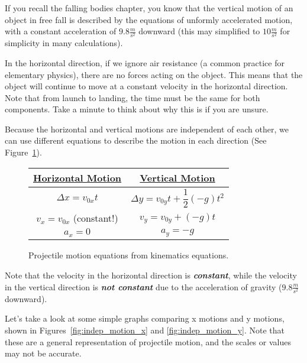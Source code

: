If you recall the falling bodies chapter, you know that the vertical motion of an object in free fall is described by the equations of unformly accelerated motion, with a constant acceleration of $9.8 \frac{m}{s^2}$ downward (this may simplified to $10 \frac{m}{s^2}$ for simplicity in many calculations).

In the horizontal direction, if we ignore air resistance (a common practice for elementary physics), there are no forces acting on the object. This means that the object will continue to move at a constant velocity in the horizontal direction. Note that from launch to landing, the time must be the same for both components. Take a minute to think about why this is if you are unsure.

Because the horizontal and vertical motions are independent of each other, we can use different equations to describe the motion in each direction (See Figure~\ref{independenceOfMotionEqs}). %
\begin{figure}
    \centering
    \begin{tabular}{|c|c|}
        \hline
        \underline{Horizontal Motion} & \underline{Vertical Motion} \\
        \hline
        $\Delta x = v_{0x} t$ & $\Delta y = v_{0y} t + \dfrac{1}{2}(-g)t^2$ \\
        $v_x = v_{0x}$ (constant!) & $v_y = v_{0y} + (-g)t$ \\
        $a_x = 0$ & $a_y = -g$ \\
        \hline
    \end{tabular}
    \caption{Projectile motion equations from kinematics equations. }\label{independenceOfMotionEqs}
\end{figure}
Note that the velocity in the horizontal direction is \emph{\textbf{constant}}, while the velocity in the vertical direction is \emph{\textbf{not constant}} due to the acceleration of gravity ($9.8 \frac{m}{s^2}$ downward).

Let's take a look at some simple graphs comparing x motions and y motions, shown in Figures~\ref{fig:indep_motion_x} and \ref{fig:indep_motion_y}. Note that these are a general representation of projectile motion, and the scales or values may not be accurate. %

